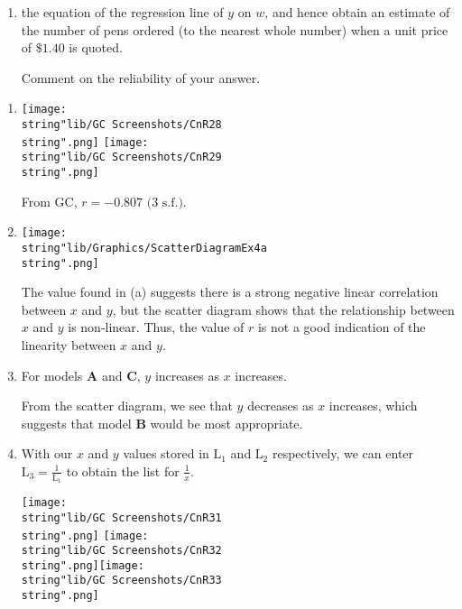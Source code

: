 \documentclass[11pt,a4paper]{book}
\begin{document}
\begin{example}
\begin{enumerate}[label=(\alph*),start=4]
\item  the equation of the regression line of $y$ on $w$, and hence
obtain an estimate of the number of pens ordered (to the nearest whole
number) when a unit price of $\$1.40$ is quoted.

Comment on the reliability of your answer.

\end{enumerate}

\Solution

\begin{enumerate}[label=(\alph*)]

\item  \texttt{[image: \\string"lib/GC Screenshots/CnR28\\string".png]}
\hspace{1cm}\texttt{[image: \\string"lib/GC Screenshots/CnR29\\string".png]}

From GC, $r=-0.807\text{ (3 s.f.)}$.

\item \begin{minipage}[t]{.4\textwidth}\texttt{[image: \\string"lib/Graphics/ScatterDiagramEx4a\\string".png]}

\end{minipage}
\begin{minipage}[t]{.45\textwidth}

The value found in (a) suggests there is a strong negative linear
correlation between $x$ and $y$, but the scatter diagram shows that
the relationship between $x$ and $y$ is non-linear. Thus, the value
of $r$ is not a good indication of the linearity between $x$ and
$y$.

\end{minipage}

\item  For models $\textbf{A}$ and $\textbf{C}$, $y$ increases
as $x$ increases.

From the scatter diagram, we see that $y$ decreases as $x$ increases,
which suggests that model $\textbf{B}$ would be most appropriate.

\item  With our $x$ and $y$ values stored in $\text{L}_{1}$ and
$\text{L}_{2}$ respectively, we can enter ${\displaystyle \text{L}_{3}=\frac{1}{\text{L}_{1}}}$
to obtain the list for ${\displaystyle \frac{1}{x}}$.

\texttt{[image: \\string"lib/GC Screenshots/CnR31\\string".png]}
\hspace{1cm}\texttt{[image: \\string"lib/GC Screenshots/CnR32\\string".png]}\hspace{1cm}\texttt{[image: \\string"lib/GC Screenshots/CnR33\\string".png]}


\end{enumerate}
\end{example}
\end{document}
